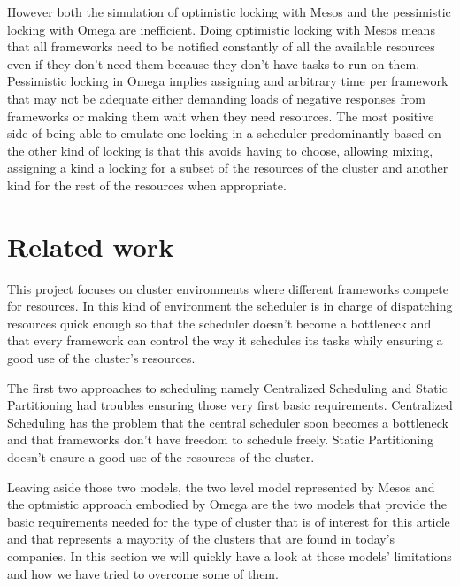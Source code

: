 \documentclass{report}                     %
\begin{document}
However both the simulation of optimistic locking with Mesos and the
pessimistic locking with Omega are inefficient. Doing optimistic
locking with Mesos means that all frameworks need to be notified
constantly of all the available resources even if they don't need them
because they don't have tasks to run on them. Pessimistic locking in
Omega implies assigning and arbitrary time per framework that may not
be adequate either demanding loads of negative responses from
frameworks or making them wait when they need resources. The most positive
side of being able to emulate one locking in a scheduler predominantly
based on the other kind of locking is that this avoids having to
choose, allowing mixing, assigning a kind a locking for a subset of
the resources of the cluster and another kind for the rest of the
resources when appropriate.





\chapter{Related work}

This project focuses on cluster environments where different
frameworks compete for resources. In this kind of environment the
scheduler is in charge of dispatching resources quick enough
so that the scheduler doesn't become a bottleneck and that every
framework can control the way it schedules its tasks whily ensuring
a good use of the cluster's resources. 

The first two approaches to scheduling namely Centralized Scheduling
and Static Partitioning had troubles ensuring those very first basic
requirements. Centralized Scheduling has the problem that the central
scheduler soon becomes a bottleneck and that frameworks don't have
freedom to schedule freely. Static Partitioning doesn't ensure a good
use of the resources of the cluster.

Leaving aside those two models, the two level model represented by
Mesos and the optmistic approach embodied by Omega are the
two models that provide the basic requirements needed for the type of
cluster that is of interest for this article and that represents a
mayority of the clusters that are found in today's companies. In this
section we will quickly have a look at those models' limitations and
how we have tried to overcome some of them.
\end{document}
